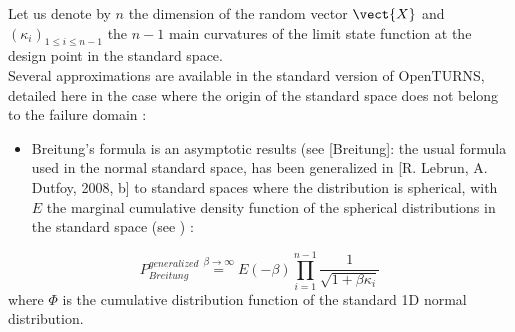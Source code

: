 {  Let us denote by $n$ the dimension of the random vector $\vect{X}$ and $(\kappa_i)_{1 \leq i \leq n-1}$ the $n-1$ main curvatures of the limit state function at the design point in the standard space.\\

  Several approximations are available in the standard version of OpenTURNS, detailed here in the case where the origin of the standard space does not belong to the failure domain : \\

  \begin{itemize}
  \item Breitung's formula is an asymptotic results (see [Breitung]: the usual formula used in the normal standard space, has been generalized in [R. Lebrun, A. Dutfoy, 2008, b] to standard spaces where the distribution is spherical, with $E$ the marginal cumulative density function of the spherical distributions in the standard space (see  ) :
  \end{itemize}
  \begin{equation}
    \label{PfSORM_B}
    P_{Breitung}^{generalized}  \stackrel{\beta\rightarrow\infty}{=} E(-\beta)\prod_{i=1}^{n-1}\frac{1}{\sqrt{1+\beta\kappa_i}}
  \end{equation}
  where $\Phi$ is the cumulative distribution function of the standard 1D normal distribution.

}
